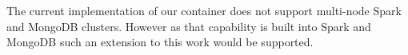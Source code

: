 \documentclass[conference,twoside]{IEEEtran}
\begin{document}
The current implementation of our container does not support multi-node Spark and MongoDB clusters. However as that capability is built into Spark and MongoDB such an extension to this work would be supported.


\end{document}
